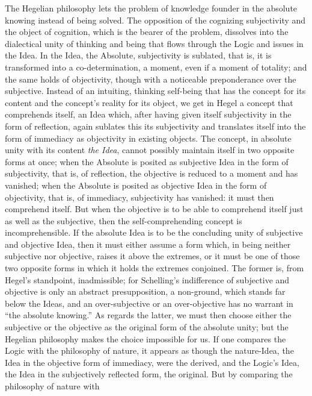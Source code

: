 \documentclass[12pt]{article}
\begin{document}
The Hegelian philosophy lets the problem of knowledge founder in the
absolute knowing instead of being solved. The opposition of the cognizing
subjectivity and the object of cognition, which is the bearer of the
problem, dissolves into the dialectical unity of thinking and being that
flows through the Logic
and issues in the Idea. In the Idea, the Absolute, subjectivity is
sublated, that is, it is transformed into a co-determination, a moment,
even if a moment of totality; and the same holds of objectivity, though
with a noticeable preponderance over the subjective. Instead of an
intuiting, thinking self-being that has the concept for its content and the
concept's reality for its object, we get in Hegel a concept that
comprehends itself, an Idea which, after having given itself subjectivity
in the form of reflection, again sublates this its subjectivity and
translates itself into the form of immediacy as objectivity in existing
objects. The concept, in absolute unity with its content \emph{the Idea},
cannot possibly maintain itself in two opposite forms at once; when the
Absolute is posited as subjective Idea in the form of subjectivity, that
is, of reflection, the objective is reduced to a moment and has vanished;
when the Absolute is posited as objective Idea in the form of objectivity,
that is, of immediacy, subjectivity has vanished: it must then comprehend
itself. But when the objective is to be able to comprehend itself just as
well as the subjective, then the self-comprehending concept is
incomprehensible. If the absolute Idea is to be the concluding unity of
subjective and objective Idea, then it must either assume a form which, in
being neither subjective nor objective, raises it above the extremes, or it
must be one of those two opposite forms in which it holds the extremes
conjoined. The former is, from Hegel's standpoint, inadmissible; for
Schelling's indifference of subjective and objective is only an abstract
presupposition, a non-ground, which stands far below the Ideas, and an
over-subjective or an over-objective has no warrant in ``the absolute
knowing.'' As regards the latter, we must then choose either the subjective
or the objective as the original form of the absolute unity; but the
Hegelian philosophy makes the choice impossible for us. If one compares the
Logic with the philosophy of nature, it appears as though the nature-Idea,
the Idea in the objective form of immediacy, were the derived, and the
Logic's Idea, the Idea in the subjectively reflected form, the original.
But by comparing the philosophy of nature with
\end{document}
